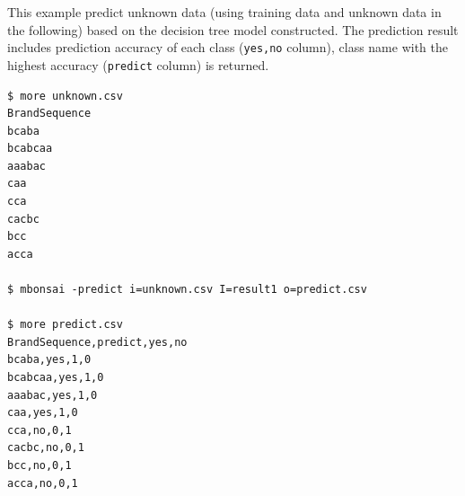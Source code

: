 This example predict unknown data (using training data and unknown data in the following) based on the decision tree model constructed. The prediction result includes prediction accuracy of each class (\verb|yes,no| column), class name with the highest accuracy (\verb|predict| column) is returned. 

\begin{Verbatim}[baselinestretch=0.7,frame=single]
$ more unknown.csv
BrandSequence
bcaba
bcabcaa
aaabac
caa
cca
cacbc
bcc
acca

$ mbonsai -predict i=unknown.csv I=result1 o=predict.csv

$ more predict.csv
BrandSequence,predict,yes,no
bcaba,yes,1,0
bcabcaa,yes,1,0
aaabac,yes,1,0
caa,yes,1,0
cca,no,0,1
cacbc,no,0,1
bcc,no,0,1
acca,no,0,1
\end{Verbatim}


%

